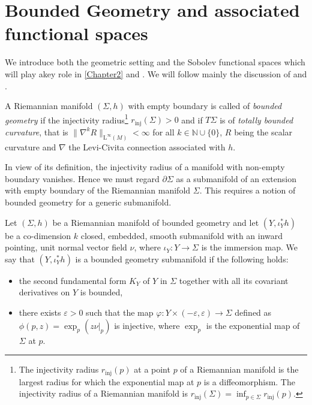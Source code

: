 \section{Bounded Geometry and associated functional spaces}
\label{Sec: Bounded Geometry and functional}

We introduce both the geometric setting and the Sobolev functional spaces which will play akey role in \ref{Chapter2} and . We will follow mainly the discussion of \cite{Dappiaggi-Drago-Ferreira-19} and \cite{Grosse-Schneider-13}.

\begin{Definition}\label{Def: bounded geometry empty bound}
	A Riemannian manifold $(\Sigma, h)$ with empty boundary is called of \emph{bounded geometry} if the injectivity radius\footnote{The injectivity radius $r_{\text{inj}}(p)$ at a point $p$ of a Riemannian manifold is the largest radius for which the exponential map at $p$ is a diffeomorphism. The injectivity radius of a Riemannian manifold is $r_{\text{inj}}(\Sigma)=\inf_{p\in \Sigma}r_{\text{inj}}(p)$. } $r_{\text{inj}} (\Sigma) > 0$ and if $T\Sigma$ is of \emph{totally bounded curvature}, that is $\|\nabla^{k} R\|_{\mathrm{L}^{\infty}(M)}<\infty$ for
	all $k \in \mathbb{N} \cup \{0\}$, $R$ being the scalar curvature and $\nabla$ the Levi-Civita connection associated with $h$.
\end{Definition}
In view of its definition, the injectivity radius of a manifold with non-empty boundary vanishes. Hence we must regard $\partial\Sigma$ as a submanifold of an extension with empty boundary of the Riemannian manifold $\Sigma$. This requires a notion of bounded geometry for a generic submanifold.

\begin{Definition}
	Let $(\Sigma,h)$ be a Riemannian manifold of bounded geometry and let $(Y, \iota_Y^* h )$ be a co-dimension $k$ closed, embedded, smooth submanifold with an inward pointing, unit normal vector field $\nu$, where $\iota_Y:Y\to\Sigma$ is the immersion map. We say that $(Y, \iota_Y^* h )$ is a bounded geometry submanifold if the following holds:
	\begin{itemize}
		\item the second fundamental form $K_Y$ of $Y$ in $\Sigma$ together with all its covariant derivatives on $Y$ is bounded,
		\item there exists $\varepsilon > 0$ such that the map $\varphi: Y \times (-\varepsilon, \varepsilon) \to \Sigma$ defined as $\phi(p,z) =\exp_p (z\nu|_p )$ is injective, where $\exp_p$ is the exponential map of $\Sigma$ at $p$.
	\end{itemize}
	
\end{Definition}


